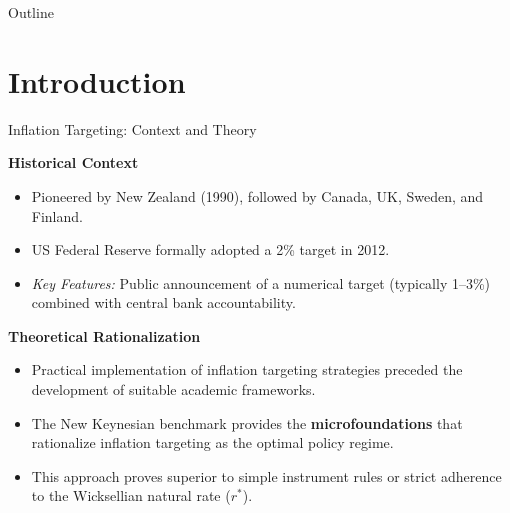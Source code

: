 \documentclass[11pt,aspectratio=169]{beamer}
\begin{document}
\begin{frame}{Outline}
\tableofcontents
\end{frame}

\section{Introduction}

\begin{frame}{Inflation Targeting: Context and Theory}
\small

\textbf{Historical Context}
\begin{itemize}
  \item Pioneered by New Zealand (1990), followed by Canada, UK, Sweden, and Finland.
  \item US Federal Reserve formally adopted a 2\% target in 2012.
  \item \emph{Key Features:} Public announcement of a numerical target (typically 1--3\%) combined with central bank accountability.
\end{itemize}

\vspace{0.1cm}

\textbf{Theoretical Rationalization}
\begin{itemize}
  \item Practical implementation of inflation targeting strategies preceded the development of suitable academic frameworks.
  \item The New Keynesian benchmark provides the \textbf{microfoundations} that rationalize inflation targeting as the optimal policy regime.
  \item This approach proves superior to simple instrument rules or strict adherence to the Wicksellian natural rate ($r^\ast$).
\end{itemize}

\end{frame}
\end{document}
